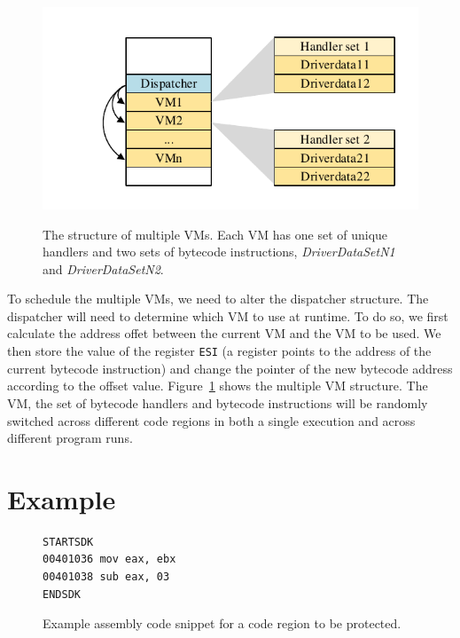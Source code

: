 \documentclass[conference]{IEEEtran}
\begin{document}
\begin{figure}[t!]
  \centering
  \includegraphics[width=0.8\columnwidth]{figure/figmvm.pdf}\\
  \caption{The structure of multiple VMs. Each VM has one set of unique handlers and two sets of bytecode instructions, \emph{DriverDataSetN1} and \emph{DriverDataSetN2}.}\label{fig:Fig.4}
\end{figure}

To schedule the multiple VMs, we need to alter the dispatcher structure. The dispatcher will need to determine which VM to use at runtime.
To do so, we first calculate the address offet between the current VM and the VM to be used. We then store the value of the register \texttt{ESI} (a register points to the address of the current bytecode instruction) and change the pointer of the new bytecode address according to the offset value. Figure~\ref{fig:Fig.4} shows the multiple VM structure. The VM, the set of bytecode handlers and bytecode instructions will be randomly switched across different code regions in both a single execution and across different program runs.


\section{Example}

\begin{figure}[t!]
\scriptsize
\begin{lstlisting}
STARTSDK
00401036 mov eax, ebx
00401038 sub eax, 03
ENDSDK
\end{lstlisting}
\vspace{-2mm}
\caption{Example assembly code snippet for a code region to be protected.}
\vspace{-5mm}
\label{fig:examplecode}
\end{figure}
\end{document}

